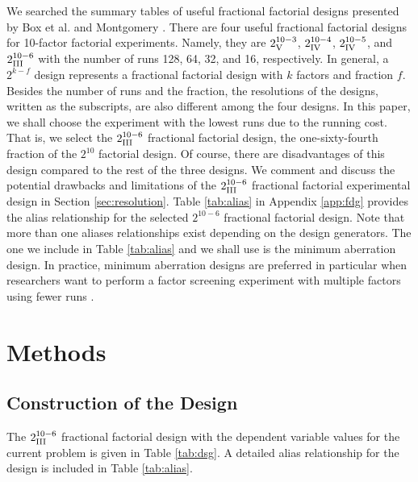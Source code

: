 \documentclass[11pt]{article}
\begin{document}
We searched the summary tables of useful fractional factorial designs presented by Box et al. \cite{bk:se} and Montgomery \cite{bk:dae2}. There are four useful fractional factorial designs for 10-factor factorial experiments. Namely, they are $2^{10-3}_{\text{\MakeUppercase{\romannumeral 5}}}$, $2^{10-4}_{\text{\MakeUppercase{\romannumeral 4}}}$, $2^{10-5}_{\text{\MakeUppercase{\romannumeral 4}}}$, and $2^{10-6}_{\text{\MakeUppercase{\romannumeral 3}}}$ with the number of runs 128, 64, 32, and 16, respectively. In general, a $2^{k-f}$ design represents a fractional factorial design with $k$ factors and fraction $f$. Besides the number of runs and the fraction, the resolutions of the designs, written as the subscripts, are also different among the four designs. In this paper, we shall choose the experiment with the lowest runs due to the running cost. That is, we select the $2^{10-6}_{\text{\MakeUppercase{\romannumeral 3}}}$ fractional factorial design, the one-sixty-fourth fraction of the ${2^{10}}$ factorial design. Of course, there are disadvantages of this design compared to the rest of the three designs. We comment and discuss the potential drawbacks and limitations of the $2^{10-6}_{\text{\MakeUppercase{\romannumeral 3}}}$ fractional factorial experimental design in Section \ref{sec:resolution}. Table \ref{tab:alias} in Appendix \ref{app:fdg} provides the alias relationship for the selected $2^{10-6}$ fractional factorial design. Note that more than one aliases relationships exist depending on the design generators. The one we include in Table \ref{tab:alias} and we shall use is the minimum aberration design. In practice, minimum aberration designs are preferred in particular when researchers want to perform a factor screening experiment with multiple factors using fewer runs \cite{ar:wang}.

\section{Methods}\label{sec:methods}
\subsection{Construction of the Design}
The $2^{10-6}_{\text{\MakeUppercase{\romannumeral 3}}}$ fractional factorial design with the dependent variable values for the current problem is given in Table \ref{tab:dsg}. A detailed alias relationship for the design is included in Table \ref{tab:alias}.
\end{document}
